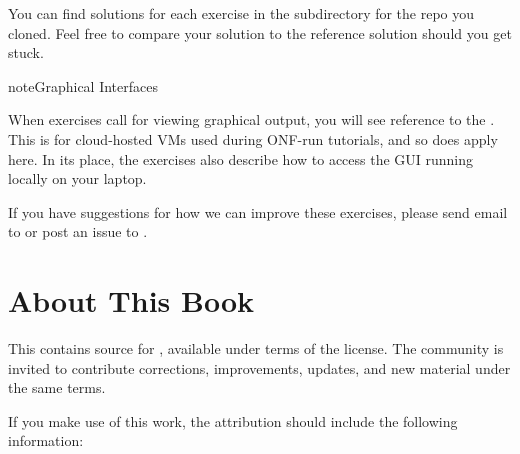 \documentclass[letterpaper,11pt,english]{sphinxmanual}
\begin{document}
You can find solutions for each exercise in the 
subdirectory for the repo you cloned.  Feel free to compare your
solution to the reference solution should you get stuck.

\label{\detokenize{exercises:warning-tutorial}}
\begin{sphinxadmonition}{note}{Graphical Interfaces}

When exercises call for viewing graphical output, you will see
reference to the . This is for
cloud-hosted VMs used during ONF-run tutorials, and so does apply
here. In its place, the exercises also describe how to access the
GUI running locally on your laptop.
\end{sphinxadmonition}

If you have suggestions for how we can improve these exercises, please
send email to  or post an issue to
.


\chapter{About This Book}
\label{\detokenize{README:about-this-book}}\label{\detokenize{README::doc}}
This  contains
source for , available under
terms of the  license. The
community is invited to contribute corrections, improvements, updates,
and new material under the same terms.

If you make use of this work, the attribution should include the
following information:

\begin{DUlineblock}{0em}
\item[] 
\item[] 
\item[]  
\item[]  
\end{DUlineblock}
\end{document}

